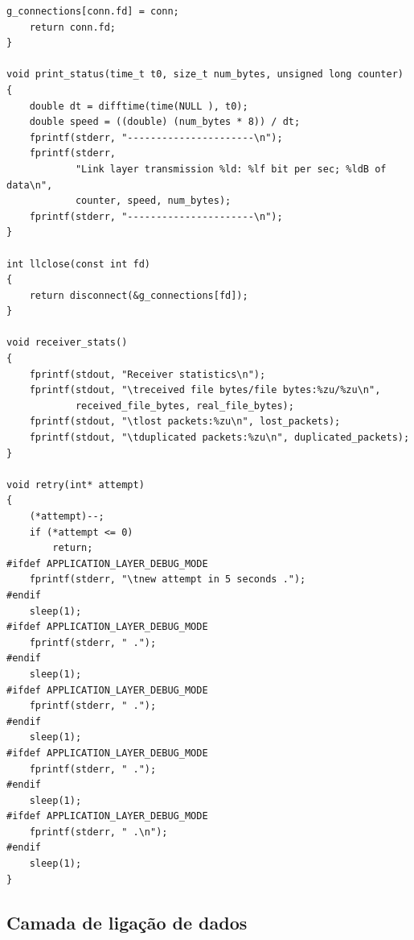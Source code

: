 \documentclass[a4paper,11pt,titlepage]{article}
\begin{document}
\begin{lstlisting}[style=customcwithlines]
	g_connections[conn.fd] = conn;
	return conn.fd;
}

void print_status(time_t t0, size_t num_bytes, unsigned long counter)
{
	double dt = difftime(time(NULL ), t0);
	double speed = ((double) (num_bytes * 8)) / dt;
	fprintf(stderr, "----------------------\n");
	fprintf(stderr,
			"Link layer transmission %ld: %lf bit per sec; %ldB of data\n",
			counter, speed, num_bytes);
	fprintf(stderr, "----------------------\n");
}

int llclose(const int fd)
{
	return disconnect(&g_connections[fd]);
}

void receiver_stats()
{
	fprintf(stdout, "Receiver statistics\n");
	fprintf(stdout, "\treceived file bytes/file bytes:%zu/%zu\n",
			received_file_bytes, real_file_bytes);
	fprintf(stdout, "\tlost packets:%zu\n", lost_packets);
	fprintf(stdout, "\tduplicated packets:%zu\n", duplicated_packets);
}

void retry(int* attempt)
{
	(*attempt)--;
	if (*attempt <= 0)
		return;
#ifdef APPLICATION_LAYER_DEBUG_MODE
	fprintf(stderr, "\tnew attempt in 5 seconds .");
#endif
	sleep(1);
#ifdef APPLICATION_LAYER_DEBUG_MODE
	fprintf(stderr, " .");
#endif
	sleep(1);
#ifdef APPLICATION_LAYER_DEBUG_MODE
	fprintf(stderr, " .");
#endif
	sleep(1);
#ifdef APPLICATION_LAYER_DEBUG_MODE
	fprintf(stderr, " .");
#endif
	sleep(1);
#ifdef APPLICATION_LAYER_DEBUG_MODE
	fprintf(stderr, " .\n");
#endif
	sleep(1);
}
\end{lstlisting}


\subsection{Camada de ligação de dados}
\end{document}
